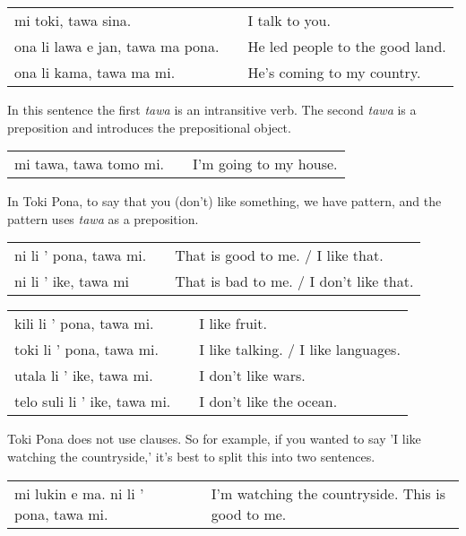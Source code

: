 \begin{supertabular}{p{5,5cm}|ll}
mi toki, tawa sina. && I talk to you. \\
ona li lawa e jan, tawa ma pona. && He led people to the good land. \\
ona li kama, tawa ma mi. && He's coming to my country. \\
\end{supertabular} 

In this sentence the first \textit{tawa} is an intransitive verb.
The second \textit{tawa} is a preposition and introduces the prepositional object. 

\begin{supertabular}{p{5,5cm}|ll}
mi tawa, tawa tomo mi. && I'm going to my house. \\
\end{supertabular} 

In Toki Pona, to say that you (don't) like something, we have pattern, and the pattern uses \textit{tawa} as a preposition.

\begin{supertabular}{p{5,5cm}|ll}
ni li ' pona, tawa mi. && That is good to me. / I like that. \\
ni li ' ike, tawa mi && That is bad to me. / I don't like that. \\
\end{supertabular} 

\begin{supertabular}{p{5,5cm}|ll}
kili li ' pona, tawa mi. && I like fruit. \\
toki li ' pona, tawa mi. && I like talking. / I like languages. \\
utala li ' ike, tawa mi. && I don't like wars. \\
telo suli li ' ike, tawa mi. && I don't like the ocean. \\
\end{supertabular} 

Toki Pona does not use clauses. 
So for example, if you wanted to say 'I like watching the countryside,' it's best to split this into two sentences.

\begin{supertabular}{p{5,5cm}|ll}
mi lukin e ma. ni li ' pona, tawa mi. && I'm watching the countryside. This is good to me.\\
\end{supertabular} 


